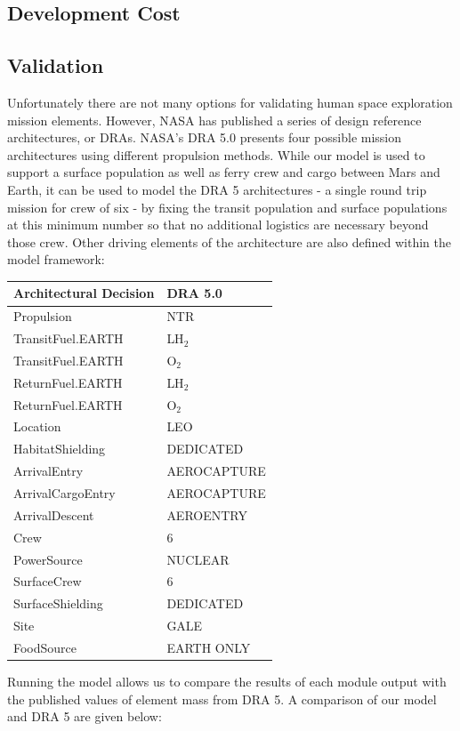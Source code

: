 \documentclass[]{aiaa-pretty}
\begin{document}
\subsection{Development Cost}


\subsection{Validation}
Unfortunately there are not many options for validating human space exploration mission elements. However, NASA has published a series of design reference architectures, or DRAs. NASA's DRA 5.0 presents four possible mission architectures using different propulsion methods. While our model is used to support a surface population as well as ferry crew and cargo between Mars and Earth, it can be used to model the DRA 5 architectures - a single round trip mission for crew of six - by fixing the transit population and surface populations at this minimum number so that no additional logistics are necessary beyond those crew. Other driving elements of the architecture are also defined within the model framework: 
\begin{center}
	\begin{tabular}{ll}
		\textbf{Architectural Decision} & \textbf{DRA 5.0} \\ \hline
		Propulsion & NTR \\
		TransitFuel.EARTH & LH$_2$\\
		TransitFuel.EARTH & O$_2$\\
		ReturnFuel.EARTH & LH$_2$\\
		ReturnFuel.EARTH & O$_2$\\
		Location & LEO\\
		HabitatShielding & DEDICATED\\
		ArrivalEntry & AEROCAPTURE\\
		ArrivalCargoEntry & AEROCAPTURE\\
		ArrivalDescent & AEROENTRY\\
		Crew & 6\\
		PowerSource & NUCLEAR\\
		SurfaceCrew & 6\\
		SurfaceShielding & DEDICATED\\
		Site & GALE\\
		FoodSource & EARTH ONLY\\
	\end{tabular}
\end{center}
Running the model allows us to compare the results of each module output with the published values of element mass from DRA 5. A comparison of our model and DRA 5 are given below:
\end{document}
